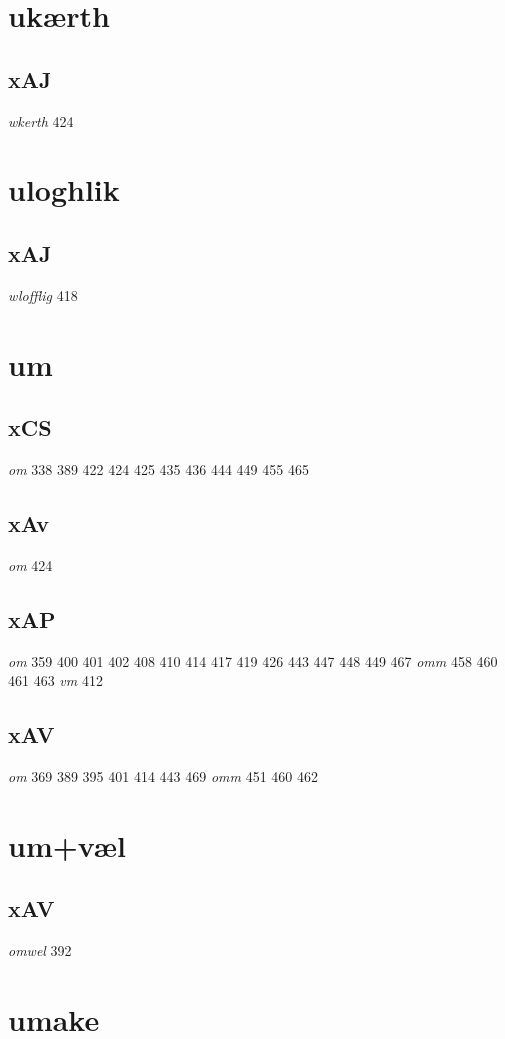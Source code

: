 \documentclass[a4paper,twocolumn]{article}
\begin{document}
\section{ukærth}
\label{sec:org53ea7f3}
\subsection{xAJ}
\label{sec:org4de424a}
\emph{wkerth} 424 
\section{uloghlik}
\label{sec:org376ebd3}
\subsection{xAJ}
\label{sec:org8af9d07}
\emph{wlofflig} 418 
\section{um}
\label{sec:orga6c4946}
\subsection{xCS}
\label{sec:org9c69066}
\emph{om} 338 389 422 424 425 435 436 444 449 455 465 
\subsection{xAv}
\label{sec:org5fbc796}
\emph{om} 424 
\subsection{xAP}
\label{sec:org771d744}
\emph{om} 359 400 401 402 408 410 414 417 419 426 443 447 448 449 467 \emph{omm} 458 460 461 463 \emph{vm} 412 
\subsection{xAV}
\label{sec:orgd8f1a97}
\emph{om} 369 389 395 401 414 443 469 \emph{omm} 451 460 462 
\section{um+væl}
\label{sec:org819ab5f}
\subsection{xAV}
\label{sec:orgeacbf04}
\emph{omwel} 392 
\section{umake}
\label{sec:org91a360c}
\end{document}
